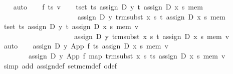 \begin{isabellebody}
\ \ \isamarkupfalse%
\ auto\isanewline
{}\isamarkupfalse%
\isanewline
\ \ \isamarkupfalse%
\ f\ ts\ v\isanewline
\ \ \isamarkupfalse%
\ {}{}t{}set\ ts{}\ assign\ D\ y\ t\ {}assign\ D\ x\ s\ mem{}\ {}\isanewline
\ \ \ \ \ \ \ \ \ \ \ \ \ \ \ \ \ \ \ \ \ \ assign\ D\ y\ {}trm{}subst\ x\ s\ t{}\ {}assign\ D\ x\ s\ mem{}{}\isanewline
\ \ \isamarkupfalse%
\ {}{}t{}set\ ts{}\ assign\ D\ y\ t\ {}assign\ D\ x\ s\ mem{}\ v\ {}\isanewline
\ \ \ \ \ \ \ \ \ \ \ \ \ \ \ \ \ \ \ \ \ assign\ D\ y\ {}trm{}subst\ x\ s\ t{}\ {}assign\ D\ x\ s\ mem{}\ v{}\isanewline
\ \ \ \ \isamarkupfalse%
\ auto\isanewline
\ \ \isamarkupfalse%
\ {}assign\ D\ y\ {}App\ f\ ts{}\ {}assign\ D\ x\ s\ mem{}\ v\ {}\isanewline
\ \ \ \ \ \ \ \ assign\ D\ y\ {}App\ f\ {}map\ {}trm{}subst\ x\ s{}\ ts{}{}\ {}assign\ D\ x\ s\ mem{}\ v{}\isanewline
\ \ \ \ \isamarkupfalse%
\ {}simp\ add{}\ assign{}def\ set{}mem{}def\ o{}def{}\isanewline

\end{isabellebody}
